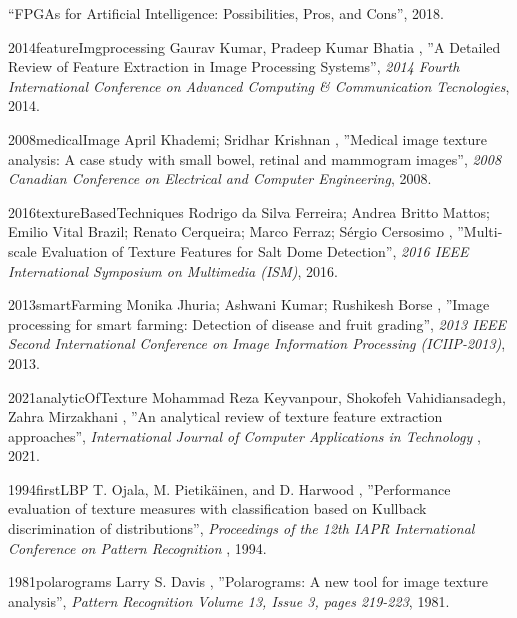 \documentclass[a4paper,12pt,oneside]{book}%
\begin{document}
\begin{thebibliography}{xx}
	``FPGAs for Artificial Intelligence: Possibilities, Pros, and Cons'', 2018.
	
	
	
	{2014}{featureImgprocessing}
	Gaurav Kumar, Pradeep Kumar Bhatia
	, ''A Detailed Review of Feature Extraction in Image Processing Systems'', {\em 2014 Fourth International Conference on Advanced Computing \& Communication Tecnologies}, 2014.
	
	{2008}{medicalImage}
	April Khademi; Sridhar Krishnan
	, ''Medical image texture analysis: A case study with small bowel, retinal and mammogram images'', {\em 2008 Canadian Conference on Electrical and Computer Engineering}, 2008.
	
	{2016}{textureBasedTechniques}
	Rodrigo da Silva Ferreira; Andrea Britto Mattos; Emilio Vital Brazil; Renato Cerqueira; Marco Ferraz; Sérgio Cersosimo
	, ''Multi-scale Evaluation of Texture Features for Salt Dome Detection'', {\em 2016 IEEE International Symposium on Multimedia (ISM)}, 2016.
	
	{2013}{smartFarming}
	Monika Jhuria; Ashwani Kumar; Rushikesh Borse
	, ''Image processing for smart farming: Detection of disease and fruit grading'', {\em 2013 IEEE Second International Conference on Image Information Processing (ICIIP-2013)}, 2013.
	
	
	{2021}{analyticOfTexture}
	Mohammad Reza Keyvanpour, Shokofeh Vahidiansadegh, Zahra Mirzakhani
	, ''An analytical review of texture feature extraction approaches'', {\em International Journal of Computer Applications in Technology }, 2021.
	
	{1994}{firstLBP}
	T. Ojala, M. Pietikäinen, and D. Harwood 
	, ''Performance evaluation of texture measures with classification based on Kullback discrimination of distributions'', {\em  Proceedings of the 12th IAPR International Conference on Pattern Recognition }, 1994.
	
	{1981}{polarograms}
	Larry S. Davis
	, ''Polarograms: A new tool for image texture analysis'', {\em  Pattern Recognition Volume 13, Issue 3, pages 219-223}, 1981.
	

\end{thebibliography}
\end{document}
